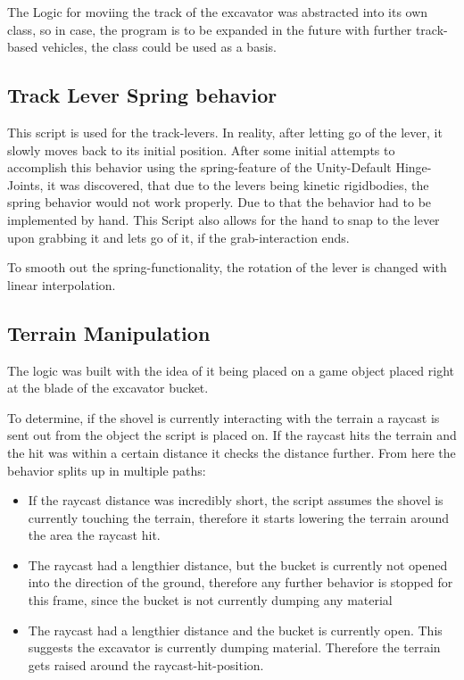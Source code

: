 \documentclass[journal]{vgtc}                     %
\begin{document}
The Logic for moviing the track of the excavator was abstracted into its own class, so in case, the program is to be expanded in the future with further track-based vehicles, the class could be used as a basis.


\subsection{Track Lever Spring behavior}
This script is used for the track-levers. In reality, after letting go of the lever, it slowly moves back to its initial position. After some initial attempts to accomplish this behavior using the spring-feature of the Unity-Default Hinge-Joints, it was discovered, that due to the levers being kinetic rigidbodies, the spring behavior would not work properly. Due to that the behavior had to be implemented by hand. This Script also allows for the hand to snap to the lever upon grabbing it and lets go of it, if the grab-interaction ends.

To smooth out the spring-functionality, the rotation of the lever is changed with linear interpolation.


\subsection{Terrain Manipulation}

The logic was built with the idea of it being placed on a game object placed right at the blade of the excavator bucket.

To determine, if the shovel is currently interacting with the terrain a raycast is sent out from the object the script is placed on. If the raycast hits the terrain and the hit was within a certain distance it checks the distance further. From here the behavior splits up in multiple paths:

\begin{itemize}
  \item If the raycast distance was incredibly short, the script assumes the shovel is currently touching the terrain, therefore it starts lowering the terrain around the area the raycast hit.
  \item The raycast had a lengthier distance, but the bucket is currently not opened into the direction of the ground, therefore any further behavior is stopped for this frame, since the bucket is not currently dumping any material
  \item The raycast had a lengthier distance and the bucket is currently open. This suggests the excavator is currently dumping material. Therefore the terrain gets raised around the raycast-hit-position.
\end{itemize}
\end{document}
